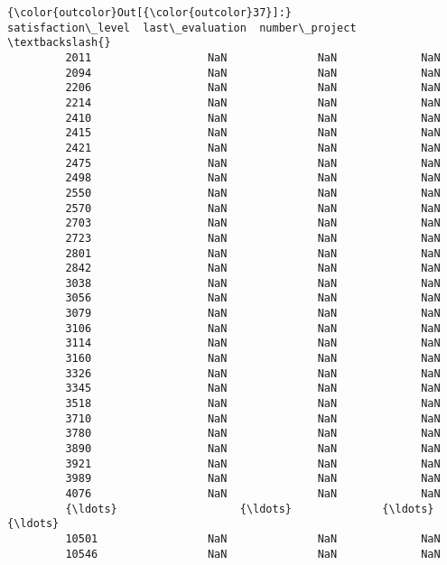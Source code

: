 \documentclass[11pt]{article}
\begin{document}
\begin{Verbatim}[commandchars=\\\{\}]
{\color{outcolor}Out[{\color{outcolor}37}]:}        satisfaction\_level  last\_evaluation  number\_project  \textbackslash{}
         2011                  NaN              NaN             NaN   
         2094                  NaN              NaN             NaN   
         2206                  NaN              NaN             NaN   
         2214                  NaN              NaN             NaN   
         2410                  NaN              NaN             NaN   
         2415                  NaN              NaN             NaN   
         2421                  NaN              NaN             NaN   
         2475                  NaN              NaN             NaN   
         2498                  NaN              NaN             NaN   
         2550                  NaN              NaN             NaN   
         2570                  NaN              NaN             NaN   
         2703                  NaN              NaN             NaN   
         2723                  NaN              NaN             NaN   
         2801                  NaN              NaN             NaN   
         2842                  NaN              NaN             NaN   
         3038                  NaN              NaN             NaN   
         3056                  NaN              NaN             NaN   
         3079                  NaN              NaN             NaN   
         3106                  NaN              NaN             NaN   
         3114                  NaN              NaN             NaN   
         3160                  NaN              NaN             NaN   
         3326                  NaN              NaN             NaN   
         3345                  NaN              NaN             NaN   
         3518                  NaN              NaN             NaN   
         3710                  NaN              NaN             NaN   
         3780                  NaN              NaN             NaN   
         3890                  NaN              NaN             NaN   
         3921                  NaN              NaN             NaN   
         3989                  NaN              NaN             NaN   
         4076                  NaN              NaN             NaN   
         {\ldots}                   {\ldots}              {\ldots}             {\ldots}   
         10501                 NaN              NaN             NaN   
         10546                 NaN              NaN             NaN   

\end{Verbatim}
\end{document}
